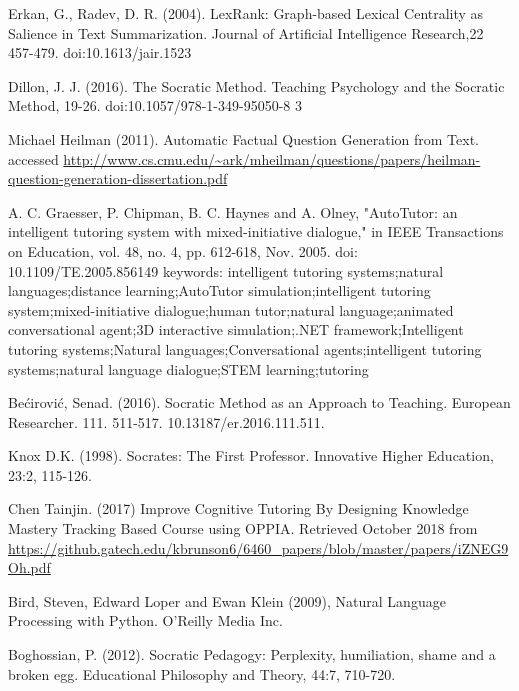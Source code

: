 \documentclass{sigchi}
\begin{document}
  \begin{thebibliography}{1}

  Erkan, G., Radev, D. R. (2004). LexRank: Graph-based Lexical Centrality as Salience in Text Summarization. Journal of Artificial Intelligence Research,22 457-479. doi:10.1613/jair.1523

  Dillon, J. J. (2016). The Socratic Method. Teaching Psychology and the Socratic Method, 19-26. doi:10.1057/978-1-349-95050-8 3

  Michael Heilman (2011). Automatic Factual Question Generation from Text. accessed \url{http://www.cs.cmu.edu/~ark/mheilman/questions/papers/heilman-question-generation-dissertation.pdf}

  A. C. Graesser, P. Chipman, B. C. Haynes and A. Olney, "AutoTutor: an intelligent tutoring system with mixed-initiative dialogue," in IEEE Transactions on Education, vol. 48, no. 4, pp. 612-618, Nov. 2005. doi: 10.1109/TE.2005.856149 keywords: {intelligent tutoring systems;natural languages;distance learning;AutoTutor simulation;intelligent tutoring system;mixed-initiative dialogue;human tutor;natural language;animated conversational agent;3D interactive simulation;.NET framework;Intelligent tutoring systems;Natural languages;Conversational agents;intelligent tutoring systems;natural language dialogue;STEM learning;tutoring}

  Bećirović, Senad. (2016). Socratic Method as an Approach to Teaching. European Researcher. 111. 511-517. 10.13187/er.2016.111.511. 

  Knox D.K. (1998). Socrates: The First Professor. Innovative Higher Education, 23:2, 115-126.

  Chen Tainjin. (2017) Improve Cognitive Tutoring By Designing Knowledge Mastery Tracking Based Course using OPPIA. Retrieved October 2018 from \url{https://github.gatech.edu/kbrunson6/6460_papers/blob/master/papers/iZNEG9Oh.pdf}

  Bird, Steven, Edward Loper and Ewan Klein (2009), Natural Language Processing with Python. O’Reilly Media Inc.

  Boghossian, P. (2012). Socratic Pedagogy: Perplexity, humiliation, shame and a broken egg. Educational Philosophy and Theory, 44:7, 710-720.


  
    \end{thebibliography}


  
\end{document}
